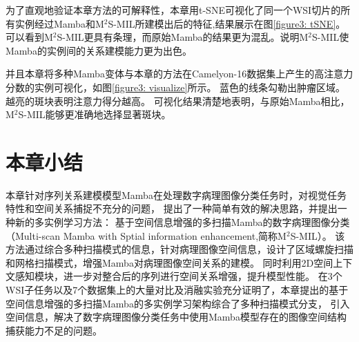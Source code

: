 为了直观地验证本章方法的可解释性，本章用t-SNE可视化了同一个WSI切片的所有实例经过Mamba和M$^2$S-MIL所建模出后的特征,结果展示在图\ref{figure3: tSNE}。
可以看到M$^2$S-MIL更具有条理，而原始Mamba的结果更为混乱。说明M$^2$S-MIL使Mamba的实例间的关系建模能力更为出色。

并且本章将多种Mamba变体与本章的方法在Camelyon-16数据集上产生的高注意力分数的实例可视化，如图\ref{figure3: visualize}所示。
蓝色的线条勾勒出肿瘤区域。越亮的斑块表明注意力得分越高。
可视化结果清楚地表明，与原始Mamba相比，M$^2$S-MIL能够更准确地选择显著斑块。
 

\section[\hspace{-2pt}本章小结]{{\heiti{} \hspace{-8pt}本章小结}}\label{section3: 本章小结}

本章针对序列关系建模模型Mamba在处理数字病理图像分类任务时，对视觉任务特性和空间关系捕捉不充分的问题，
提出了一种简单有效的解决思路，并提出一种新的多实例学习方法：
基于空间信息增强的多扫描Mamba的数字病理图像分类（Multi-scan Mamba with Sptial information enhancement,简称M$^2$S-MIL）。
该方法通过综合多种扫描模式的信息，针对病理图像空间信息，设计了区域螺旋扫描和网格扫描模式，增强Mamba对病理图像空间关系的建模。
同时利用2D空间上下文感知模块，进一步对整合后的序列进行空间关系增强，提升模型性能。
在3个WSI子任务以及7个数据集上的大量对比及消融实验充分证明了，本章提出的基于空间信息增强的多扫描Mamba的多实例学习架构综合了多种扫描模式分支，
引入空间信息，解决了数字病理图像分类任务中使用Mamba模型存在的图像空间结构捕获能力不足的问题。
